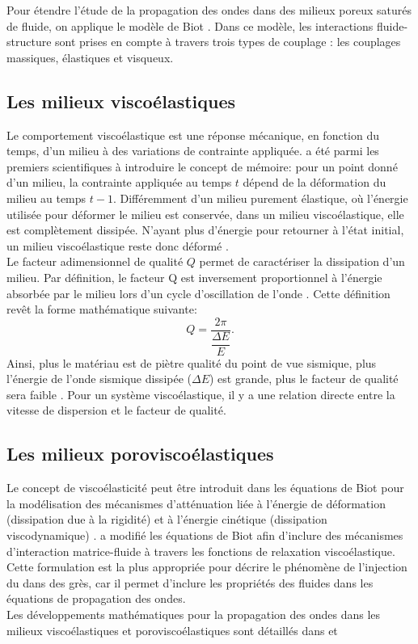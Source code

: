 Pour étendre l'étude de la propagation des ondes dans des milieux poreux saturés de fluide, on applique le modèle de Biot \citep{Biot1956a,Biot1956b}. Dans ce modèle, les interactions fluide-structure sont prises en compte à travers trois types de couplage : les couplages massiques, élastiques et visqueux.
\subsection{Les milieux viscoélastiques}
Le comportement viscoélastique est une réponse mécanique, en fonction du temps, d'un milieu à des variations de contrainte appliquée. \citet{Boltzmann1874} a été parmi les premiers scientifiques à introduire le concept de mémoire: pour un point donné d'un milieu, la contrainte appliquée au temps $t$ dépend de la déformation du milieu au temps $t-1$. Différemment d'un milieu purement élastique, où l'énergie utilisée pour déformer le milieu est conservée, dans un milieu viscoélastique, elle est complètement dissipée. N'ayant plus d'énergie pour retourner à l'état initial, un milieu viscoélastique reste donc déformé \citep{Carcione2007}. \\
Le facteur adimensionnel de qualité $Q$ permet de caractériser la dissipation d'un milieu. Par définition, le facteur Q est inversement proportionnel à l’énergie absorbée par le milieu lors d’un cycle d’oscillation de l’onde \citep{Sheriff1995}.  Cette définition revêt la forme
mathématique suivante:
\begin{equation}
Q = \dfrac{2\pi}{\dfrac{\Delta E}{E}}.
\label{eq:facteur_Q}
\end{equation}
Ainsi, plus le matériau est de piètre qualité du point de vue sismique, plus l’énergie de l’onde sismique dissipée ($\Delta E$) est grande, plus le facteur de qualité sera faible \citep{Giroux2001}. Pour un système viscoélastique, il y a une relation directe entre la vitesse de dispersion et le facteur de qualité. 
\subsection{Les milieux poroviscoélastiques}
Le concept de viscoélasticité peut être introduit dans les équations de Biot \citep{Biot1956a,Biot1956b} pour la modélisation des mécanismes d'atténuation liée à l'énergie de déformation (dissipation due à la rigidité) et à l'énergie cinétique (dissipation viscodynamique) \citep{Carcione2007}. \citet{Carcione1998} a modifié les équations de Biot afin d'inclure des mécanismes d'interaction matrice-fluide à travers les fonctions de relaxation viscoélastique. Cette formulation est la plus appropriée pour décrire le phénomène de l'injection du  dans des grès, car il permet d’inclure les propriétés des fluides dans les équations de propagation des ondes.\\
Les développements mathématiques pour la propagation des ondes dans les milieux viscoélastiques et poroviscoélastiques sont détaillés dans \citet{Bourbie1986} et \citet{Carcione2007}
